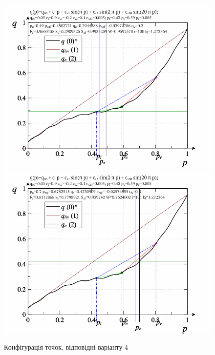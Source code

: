 \begin{figure}[htb!]
  \begin{center}
    \includegraphics[width=49\TW]{p/pq_sin-p_pq_po=049.png}
    \hfill
    \includegraphics[width=49\TW]{p/pq_sin-p_pq_po=070.png}
  \end{center}
  \caption{Конфігурація точок, відповідні варіанту 4}
  \label{atu:f:pq_4}
\end{figure}


